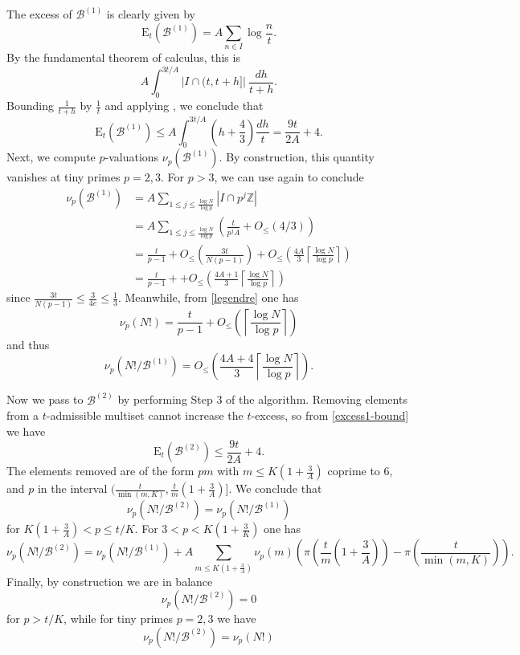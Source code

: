 \documentclass[12pt,a4paper,reqno]{amsart}
\numberwithin{equation}{section}
\theoremstyle{plain}
\theoremstyle{definition}
\newcommand\Z{\mathbb{Z}}
\newcommand\tuple{{\mathcal B}}
\newcommand\excess{{\mathrm{E}}}
\begin{document}
The excess of $\tuple^{(1)}$ is clearly given by
$$ \excess_t(\tuple^{(1)}) = A \sum_{n \in I} \log \frac{n}{t}.$$
By the fundamental theorem of calculus, this is
$$ A \int_0^{3t/A} |I \cap (t, t+h]|\ \frac{dh}{t+h}.$$
Bounding $\frac{1}{t+h}$ by $\frac{1}{t}$ and applying , we conclude that
\begin{equation}\label{excess1-bound}
 \excess_t(\tuple^{(1)}) \leq A \int_0^{3t/A} \left(h + \frac{4}{3}\right) \frac{dh}{t} = \frac{9t}{2A} + 4.
\end{equation}
Next, we compute $p$-valuations $\nu_p(\tuple^{(1)})$.  By construction, this quantity vanishes at tiny primes $p=2,3$.  For $p>3$, we can use  again to conclude
\begin{align*}
  \nu_p(\tuple^{(1)}) &= A \sum_{1 \leq j \leq \frac{\log N}{\log p}} |I \cap p^j \Z| \\
  &= A \sum_{1 \leq j \leq \frac{\log N}{\log p}} \left(\frac{t}{p^j A} + O_{\leq}(4/3)\right) \\
  &= \frac{t}{p-1} + O_{\leq}\left(\frac{3t}{N(p-1)}\right)
  + O_{\leq}\left(\frac{4A}{3} \left\lceil \frac{\log N}{\log p}  \right\rceil\right) \\
  &= \frac{t}{p-1} +
  + O_{\leq}\left(\frac{4A+1}{3} \left\lceil \frac{\log N}{\log p}  \right\rceil\right) 
\end{align*}
since $\frac{3t}{N(p-1)} \leq \frac{3}{4e} \leq \frac{1}{3}$.
Meanwhile, from \eqref{legendre} one has
$$ \nu_p(N!) = \frac{t}{p-1} + O_{\leq}\left(\left\lceil \frac{\log N}{\log p}  \right\rceil\right)$$
and thus
\begin{equation}\label{nup} 
  \nu_p(N!/\tuple^{(1)}) =  
O_{\leq}\left(\frac{4A+4}{3} \left\lceil \frac{\log N}{\log p}  \right\rceil\right).
\end{equation}

Now we pass to $\tuple^{(2)}$ by performing Step 3 of the algorithm.  Removing elements from a $t$-admissible multiset cannot increase the $t$-excess, so from \eqref{excess1-bound} we have
\begin{equation}\label{excess2-bound} 
  \excess_t(\tuple^{(2)}) \leq \frac{9t}{2A} + 4.
\end{equation}
The elements removed are of the form $pm$ with $m \leq K(1+\frac{3}{A})$ coprime to $6$, and $p$ in the interval $(\frac{t}{\min(m,K)}, \frac{t}{m}(1+\frac{3}{A})]$.  We conclude that
$$ \nu_p( N!/\tuple^{(2)} ) = \nu_p( N!/\tuple^{(1)})$$
for $K(1+\frac{3}{A}) < p \leq t/K$.  For $3 < p < K(1+\frac{3}{K})$ one has
\begin{equation}\label{nup-2}
 \nu_p( N!/\tuple^{(2)} ) = \nu_p(N!/\tuple^{(1)}) + A \sum_{m \leq K(1+\frac{3}{A})} \nu_p(m) \left(\pi\left(\frac{t}{m}(1+\frac{3}{A})\right)
- \pi\left(\frac{t}{\min(m,K)}\right) \right).
\end{equation}
Finally, by construction we are in balance
$$ \nu_p(N!/\tuple^{(2)}) = 0$$
for $p>t/K$, while for tiny primes $p=2,3$ we have
$$ \nu_p(N!/\tuple^{(2)}) = \nu_p(N!)$$
\end{document}
